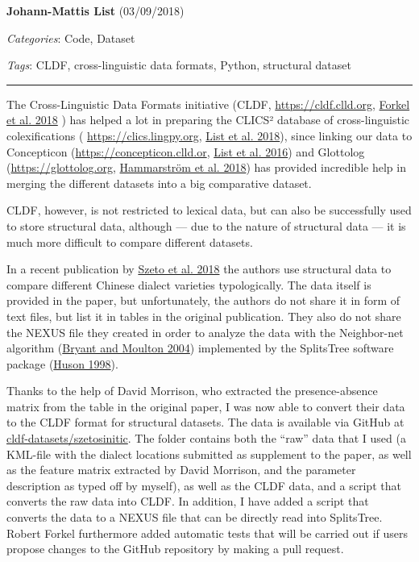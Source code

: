 \documentclass[
  english,
  a4paper,
  oneside,tablecaptionabove
]{scrbook}
\begin{document}
\textbf{Johann-Mattis List} (03/09/2018)

\emph{Categories}: Code, Dataset

\emph{Tags}: CLDF, cross-linguistic data formats, Python, structural
dataset

\begin{center}\rule{0.5\linewidth}{\linethickness}\end{center}

The Cross-Linguistic Data Formats initiative (CLDF,
\url{https://cldf.clld.org},
\href{http://bibliography.lingpy.org?key=Forkel2018}{Forkel et al. 2018}
) has helped a lot in preparing the CLICS² database of cross-linguistic
colexifications ( \url{https://clics.lingpy.org},
\href{http://bibliography.lingpy.org?key=List2018e}{List et al. 2018}),
since linking our data to Concepticon (\url{https://concepticon.clld.or}, \href{http://bibliography.lingpy.org?key=List2016xxx}{List et al. 2016}) and Glottolog (\url{https://glottolog.org}, \href{http://bibliography.lingpy.org?key=Hammarstroem2018}{Hammarström
et al. 2018}) has provided incredible help in merging the different
datasets into a big comparative dataset.

CLDF, however, is not restricted to lexical data, but can also be
successfully used to store structural data, although --- due to the
nature of structural data --- it is much more difficult to compare
different datasets.

\leavevmode\hypertarget{markdown}{}%
In a recent publication by
\href{http://bibliography.lingpy.org?key=Szeto2018}{Szeto et al. 2018}
the authors use structural data to compare different Chinese dialect
varieties typologically. The data itself is provided in the paper, but
unfortunately, the authors do not share it in form of text files, but
list it in tables in the original publication. They also do not share
the NEXUS file they created in order to analyze the data with the
Neighbor-net algorithm (\href{http://bibliography.lingpy.org?key=Bryant2004}{Bryant and Moulton
2004}) implemented by the SplitsTree software package (\href{http://bibliography.lingpy.org?key=Huson1998}{Huson 1998}).

Thanks to the help of David Morrison, who extracted the presence-absence
matrix from the table in the original paper, I was now able to convert
their data to the CLDF format for structural datasets. The data is
available via GitHub at
\href{https://github.com/cldf-datasets/szetosinitic}{cldf-datasets/szetosinitic}.
The folder contains both the \enquote{raw} data that I used (a KML-file
with the dialect locations submitted as supplement to the paper, as well
as the feature matrix extracted by David Morrison, and the parameter
description as typed off by myself), as well as the CLDF data, and a
script that converts the raw data into CLDF. In addition, I have added a
script that converts the data to a NEXUS file that can be directly read
into SplitsTree. Robert Forkel furthermore added automatic tests that
will be carried out if users propose changes to the GitHub repository by
making a pull request.
\end{document}
